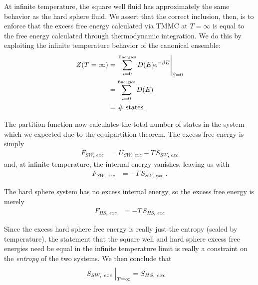 \documentclass[12pt]{article}
\begin{document}
At infinite temperature, the square well fluid has approximately the same behavior as the hard sphere fluid.  We assert that the correct inclusion, then, is to enforce that the excess free energy calculated via TMMC at $T=\infty$ is equal to the free energy calculated through thermodynamic integration. We do this by exploiting the infinite temperature behavior of the canonical ensemble:
\begin{align}
    Z(T=\infty) &= \left.\sum_{i=0}^{\text{\tiny Energies}} D(E) e^{-\beta E}\right|_{\beta = 0}\\
    &= \sum_{i=0}^{\text{\tiny Energies}} D(E)\\
    &= \#\text{~states}\;.
\end{align}

The partition function now calculates the total number of states in the system which we expected due to the equipartition theorem. The excess free energy is simply
\begin{align*}
    F_{SW,~exc} &= U_{SW,~exc} - T\,S_{SW,~exc}     
\end{align*} 
and, at infinite temperature, the internal energy vanishes, leaving us with
\begin{align}
    F_{SW,~exc} &= -T\,S_{SW, ~exc} \;.
\end{align}

The hard sphere system has no excess internal energy, so the excess free energy is merely
\begin{align*}
     F_{HS,~exc} &= -T\,S_{HS,~exc} 
\end{align*} 

Since the excess hard sphere free energy is really just the entropy (scaled by temperature), the statement that the square well and hard sphere excess free energies need be equal in the infinite temperature limit is really a constraint on the {\it entropy} of the two systems. We then conclude that
\begin{align*}
    S_{SW,~exc} \Bigm\lvert_{T=\infty} &= S_{HS,~exc}
\end{align*}
\end{document}
